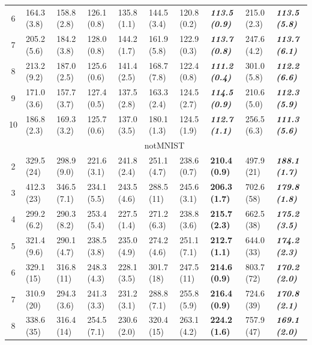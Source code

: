 \begin{table}[t]
{\begin{tabular}{@{}c|lllllll|ll@{}}
6  & 164.3 (3.8)  & 158.8 (2.8)  & 126.1 (0.8) & 135.8 (1.1) & 144.5 (3.4) & 120.8 (0.2) & \textbf{\textit{113.5 (0.9)}} & 215.0 (2.3) & \textit{\textbf{113.5 (5.8)}}  \\
7  & 205.2 (5.6)  & 184.2 (3.8)  & 128.0 (0.8) & 144.2 (1.7) & 161.9 (5.8) & 122.9 (0.3) & \textbf{\textit{113.7 (0.8)}} & 247.6 (4.2) & \textit{\textbf{113.7 (6.1)}}  \\
8  & 213.2 (9.2)  & 187.0 (2.5)  & 125.6 (0.6) & 141.4 (2.5) & 168.7 (7.8) & 122.4 (0.8) & \textbf{\textit{111.2 (0.4)}} & 301.0 (5.8) & \textit{\textbf{112.2 (6.6)}}  \\
9  & 171.0 (3.6)  & 157.7 (3.7)  & 127.4 (0.5) & 137.5 (2.8) & 163.3 (2.4) & 124.5 (2.7) & \textbf{\textit{114.5 (0.9)}} & 210.6 (5.0) & \textit{\textbf{112.3 (5.9)}}  \\
10 & 186.8 (2.3)  & 169.3 (3.2)  & 125.7 (0.6) & 137.0 (3.5) & 180.1 (1.3) & 124.5 (1.9) & \textbf{\textit{112.7 (1.1)}} & 256.5 (6.3) & \textit{\textbf{111.3 (5.6)}}   \\ \midrule
& \multicolumn{9}{c}{\multirow{2}{*}{notMNIST}}  \\
& \multicolumn{9}{c}{} \\\midrule
2  & 329.5 (24)   & 298.9 (9.0) & 221.6 (3.1) & 241.8 (2.4) & 251.1 (4.7) & 238.6 (0.7) & \textbf{210.4 (0.9)} & 497.9 (21) & \textit{\textbf{188.1 (1.7)}} \\
3  & 412.3 (23)   & 346.5 (7.1) & 234.1 (5.5) & 243.5 (4.6) & 288.5 (11)  & 245.6 (3.1) & \textbf{206.3 (1.7)} & 702.6 (58) & \textit{\textbf{179.8 (1.8)}} \\
4  & 299.2 (6.2)  & 290.3 (8.2) & 253.4 (5.4) & 227.5 (1.4) & 271.2 (6.3) & 238.8 (3.6) & \textbf{215.7 (2.3)} & 662.5 (38) & \textit{\textbf{175.2 (3.5)}} \\
5  & 321.4 (9.6)  & 290.1 (4.7) & 238.5 (3.8) & 235.0 (4.9) & 274.2 (4.6) & 251.1 (7.1) & \textbf{212.7 (1.1)} & 644.0 (33) & \textit{\textbf{174.2 (2.3)}} \\
6  & 329.1 (15)   & 316.8 (11)  & 248.3 (4.3) & 228.1 (3.5) & 301.7 (18)  & 247.5 (11)  & \textbf{214.6 (0.9)} & 803.7 (72) & \textit{\textbf{170.2 (2.0)}} \\
7  & 310.9 (20)   & 294.3 (3.6) & 241.3 (3.3) & 231.2 (3.1) & 288.8 (7.1) & 255.8 (5.9) & \textbf{216.4 (0.9)} & 724.6 (39) & \textit{\textbf{170.8 (2.1)}} \\
8  & 338.6 (35)   & 316.4 (14)  & 254.5 (7.1) & 230.6 (2.0) & 320.4 (15)  & 263.1 (4.2) & \textbf{224.2 (1.6)} & 757.9 (47) & \textit{\textbf{169.1 (2.0)}} \\

\end{tabular}}
\end{table}

